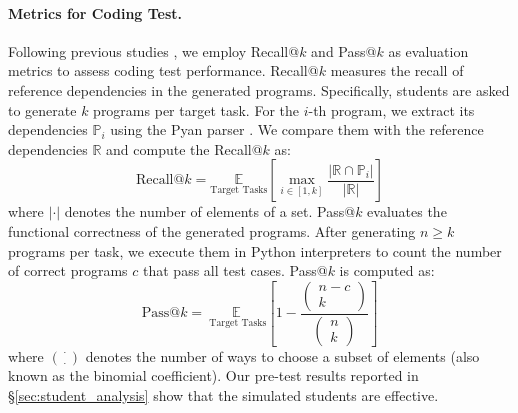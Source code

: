 \paragraph{Metrics for Coding Test.}
\label{sec:metrics_coding}
Following previous studies \cite{austin2021program,li2024evocodebench}, we employ Recall@$k$ and Pass@$k$ as evaluation metrics to assess coding test performance. Recall@$k$ measures the recall of reference dependencies in the generated programs. Specifically, students are asked to generate $k$ programs per target task. For the $i$-th program, we extract its dependencies $\mathbb{P}_{i}$ using the Pyan parser \cite{pyan2023}. We compare them with the reference dependencies $\mathbb{R}$ and compute the Recall@$k$ as:
\begin{equation}
\label{eq:recall}
\text{Recall}@k = \underset{\text{Target Tasks}}{\mathbb{E}} \left[ \max_{i \in [1, k]} \frac{|\mathbb{R} \cap \mathbb{P}_i|}{|\mathbb{R}|}\right]
\end{equation}
where $|\cdot|$ denotes the number of elements of a set. 
Pass@$k$ evaluates the functional correctness of the generated programs.
After generating $n \geq k$ programs per task, we execute them in Python interpreters to count the number of correct programs $c$ that pass all test cases. Pass@$k$ is computed as:
\begin{equation}
\label{eq:pass}
\text{Pass}@k =\underset{\text{ Target Tasks}}{\mathbb{E}}\left[1-\frac{\left(\begin{array}{c}
n-c \\
k
\end{array}\right)}{\left(\begin{array}{l}
n \\
k
\end{array}\right)}\right]
\end{equation}
where $\binom{\cdot}{\cdot}$ denotes the number of ways to choose a subset of elements (also known as the binomial coefficient). Our pre-test results reported in \S\ref{sec:student_analysis} show that the simulated students are effective.




